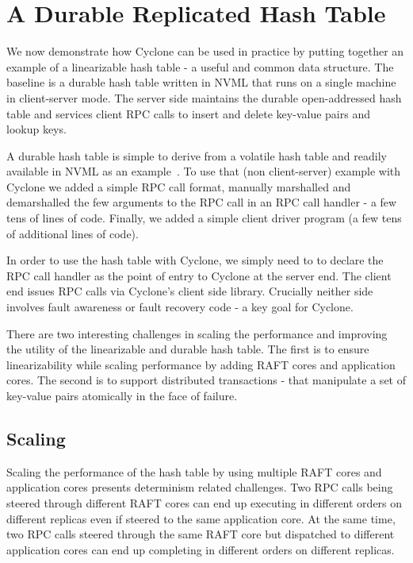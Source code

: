 \documentclass[letterpaper,twocolumn,10pt]{article}
\begin{document}
\section{A Durable Replicated Hash Table}
\label{sec:example}
We now demonstrate how Cyclone can be used in practice by putting together an
example of a linearizable hash table - a useful and common data structure.
The baseline is a durable hash table written in NVML that runs on a
single machine in client-server mode. The server side maintains the durable
open-addressed hash table and services client RPC calls to insert and delete
key-value pairs and lookup keys.

A durable hash table is simple to derive from a volatile hash table and readily
available in NVML as an example~\cite{nvml_hash}. To use that (non
client-server) example with Cyclone we added a simple RPC call format, manually
marshalled and demarshalled the few arguments to the RPC call in an RPC call
handler - a few tens of lines of code. Finally, we added a simple client driver
program (a few tens of additional lines of code).

In order to use the hash table with Cyclone, we simply need to to declare the
RPC call handler as the point of entry to Cyclone at the server end.  The client
end issues RPC calls via Cyclone's client side library. Crucially neither side
involves fault awareness or fault recovery code - a key goal for Cyclone.

There are two interesting challenges in scaling the performance and improving
the utility of the linearizable and durable hash table. The first is to ensure
linearizability while scaling performance by adding RAFT cores and application
cores. The second is to support distributed transactions - that manipulate a set
of key-value pairs atomically in the face of failure.

\subsection{Scaling}
Scaling the performance of the hash table by using multiple RAFT cores and
application cores presents determinism related challenges. Two RPC calls being
steered through different RAFT cores can end up executing in different orders on
different replicas even if steered to the same application core. At the same time,
two RPC calls steered through the same RAFT core but dispatched to different
application cores can end up completing in different orders on different replicas.
\end{document}
